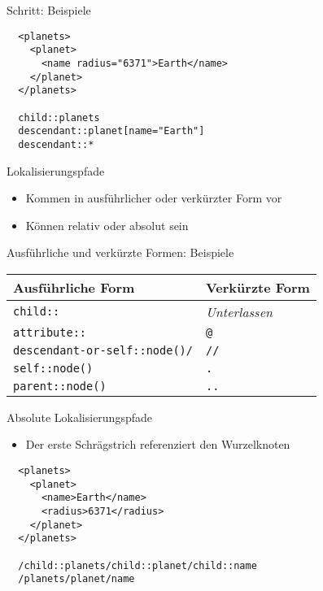 \documentclass{beamer}
\begin{document}
\begin{frame}[fragile]{Schritt: Beispiele}
	
	\lstset{language=XML}
	\begin{lstlisting}	
  <planets>
    <planet>
      <name radius="6371">Earth</name>
    </planet>
  </planets>
	
  child::planets
  descendant::planet[name="Earth"]
  descendant::*
	\end{lstlisting}
	
\end{frame}

\begin{frame}{Lokalisierungspfade}
	
	\begin{itemize}
		\item Kommen in ausführlicher oder verkürzter Form vor 
		\item Können relativ oder absolut sein
	\end{itemize}
	
\end{frame}

\begin{frame}[fragile]{Ausführliche und verkürzte Formen: Beispiele}
	
	\centering
	\begin{tabular}{l|l}
		\hline
		Ausführliche Form & Verkürzte Form \\
		\hline
		\texttt{child::} & \emph{Unterlassen} \\
		\texttt{attribute::} & \texttt{@} \\
		\texttt{descendant-or-self::node()/} & \texttt{//} \\
		\texttt{self::node()} & \texttt{.} \\
		\texttt{parent::node()} & \texttt{..}  \\
		\hline
	\end{tabular}
	
\end{frame}

\begin{frame}[fragile]{Absolute Lokalisierungspfade}
	
	\begin{itemize}
		\item Der erste Schrägstrich referenziert den Wurzelknoten
	\end{itemize}
		
	\lstset{language=XML}
	\begin{lstlisting}	
  <planets>
    <planet>
      <name>Earth</name>
      <radius>6371</radius>
    </planet>
  </planets>

  /child::planets/child::planet/child::name
  /planets/planet/name
	\end{lstlisting}
	
\end{frame}
\end{document}
